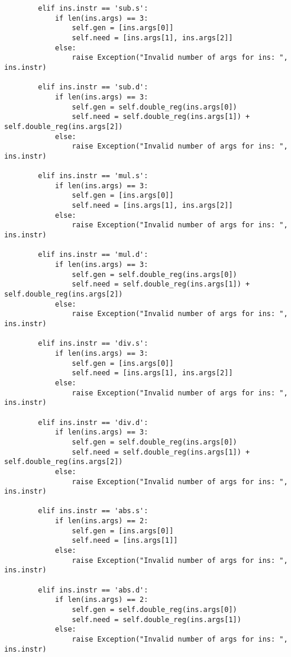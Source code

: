 \begin{lstlisting}
        elif ins.instr == 'sub.s':   
            if len(ins.args) == 3:
                self.gen = [ins.args[0]]
                self.need = [ins.args[1], ins.args[2]]
            else:
                raise Exception("Invalid number of args for ins: ", ins.instr)
                        
        elif ins.instr == 'sub.d':  
            if len(ins.args) == 3:
                self.gen = self.double_reg(ins.args[0])
                self.need = self.double_reg(ins.args[1]) + self.double_reg(ins.args[2])
            else:
                raise Exception("Invalid number of args for ins: ", ins.instr)
                        
        elif ins.instr == 'mul.s':  
            if len(ins.args) == 3:
                self.gen = [ins.args[0]]
                self.need = [ins.args[1], ins.args[2]]
            else:
                raise Exception("Invalid number of args for ins: ", ins.instr)
                        
        elif ins.instr == 'mul.d':  
            if len(ins.args) == 3:
                self.gen = self.double_reg(ins.args[0])
                self.need = self.double_reg(ins.args[1]) + self.double_reg(ins.args[2])
            else:
                raise Exception("Invalid number of args for ins: ", ins.instr)
                        
        elif ins.instr == 'div.s':  
            if len(ins.args) == 3:
                self.gen = [ins.args[0]]
                self.need = [ins.args[1], ins.args[2]]
            else:
                raise Exception("Invalid number of args for ins: ", ins.instr)
                        
        elif ins.instr == 'div.d': 
            if len(ins.args) == 3:
                self.gen = self.double_reg(ins.args[0])
                self.need = self.double_reg(ins.args[1]) + self.double_reg(ins.args[2])
            else:
                raise Exception("Invalid number of args for ins: ", ins.instr)
                         
        elif ins.instr == 'abs.s':  
            if len(ins.args) == 2:
                self.gen = [ins.args[0]]
                self.need = [ins.args[1]]
            else:
                raise Exception("Invalid number of args for ins: ", ins.instr)
                                 
        elif ins.instr == 'abs.d':  
            if len(ins.args) == 2:
                self.gen = self.double_reg(ins.args[0])
                self.need = self.double_reg(ins.args[1])
            else:
                raise Exception("Invalid number of args for ins: ", ins.instr)
                                      

\end{lstlisting}

